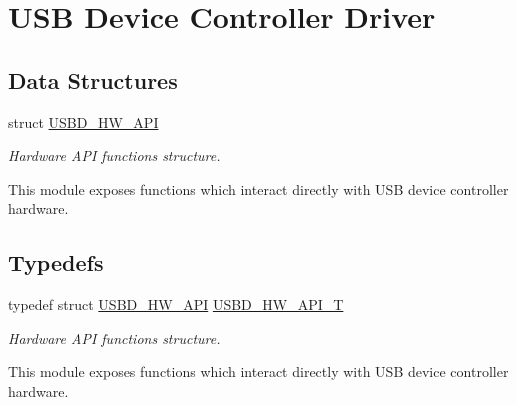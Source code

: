 \hypertarget{group__USBD__HW}{\section{U\-S\-B Device Controller Driver}
\label{group__USBD__HW}
}
\subsection*{Data Structures}
\begin{DoxyCompactItemize}
\item 
struct \hyperlink{structUSBD__HW__API}{U\-S\-B\-D\-\_\-\-H\-W\-\_\-\-A\-P\-I}
\begin{DoxyCompactList}\small\item\em Hardware A\-P\-I functions structure.

This module exposes functions which interact directly with U\-S\-B device controller hardware. \end{DoxyCompactList}\end{DoxyCompactItemize}
\subsection*{Typedefs}
\begin{DoxyCompactItemize}
\item 
typedef struct \hyperlink{structUSBD__HW__API}{U\-S\-B\-D\-\_\-\-H\-W\-\_\-\-A\-P\-I} \hyperlink{group__USBD__HW_ga4df5b7beaddc4e9267c320d92b4434fc}{U\-S\-B\-D\-\_\-\-H\-W\-\_\-\-A\-P\-I\-\_\-\-T}
\begin{DoxyCompactList}\small\item\em Hardware A\-P\-I functions structure.

This module exposes functions which interact directly with U\-S\-B device controller hardware. \end{DoxyCompactList}\end{DoxyCompactItemize}
